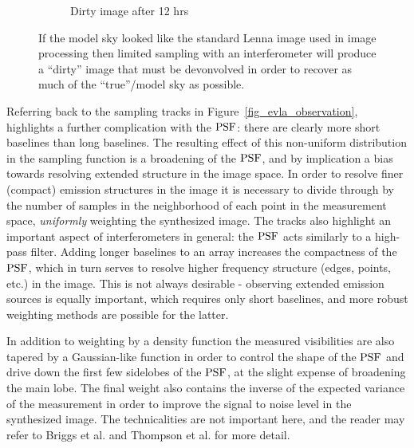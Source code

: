 \begin{figure}[ht!]
\begin{mdframed}
\begin{subfigure}[b]{0.34\textwidth}
  \caption{Dirty image after 12 hrs}
 \end{subfigure}
 \caption[Effect of observation time on dirty image synthesis]{If the model sky looked like the standard Lenna 
 image used in image processing then limited sampling with an interferometer will produce a ``dirty'' image that
 must be devonvolved in order to recover as much of the ``true''/model sky as possible.}
  \label{fig_model_convolution}
 \end{mdframed}
\end{figure}

Referring back to the sampling tracks in Figure~\ref{fig_evla_observation}, highlights a further complication with the $\textrm{PSF}$: there are clearly more short baselines than long baselines. The resulting effect of this non-uniform
distribution in the sampling function is a broadening of the $\textrm{PSF}$, and by implication a bias towards resolving extended structure in the image space. In order to resolve finer (compact) emission structures in the image
it is necessary to divide through by the number of samples in the neighborhood of each point in the measurement space, \emph{uniformly} weighting the synthesized image. The tracks also highlight an important aspect of
interferometers in general: the $\textrm{PSF}$ acts similarly to a high-pass filter. Adding longer baselines to an array increases the compactness of the $\textrm{PSF}$, which in turn serves to resolve higher frequency structure (edges, points, etc.)
in the image. This is not always desirable - observing extended emission sources is equally important, which requires only short baselines, and more robust weighting methods are possible for the latter.

In addition to weighting by a density function the measured visibilities are also tapered by a Gaussian-like function in order to control the shape of the $\textrm{PSF}$ and
drive down the first few sidelobes of the $\textrm{PSF}$, at the slight expense of broadening the main lobe. The final weight also contains the inverse of the expected variance 
of the measurement in order to improve the signal to noise level in the synthesized image. The technicalities are not important here, and the reader 
may refer to Briggs et al. \cite[Lecture 7]{taylor1999synthesis} and Thompson et al. \cite[p. 387-399]{thompson2008interferometry} for 
more detail.

